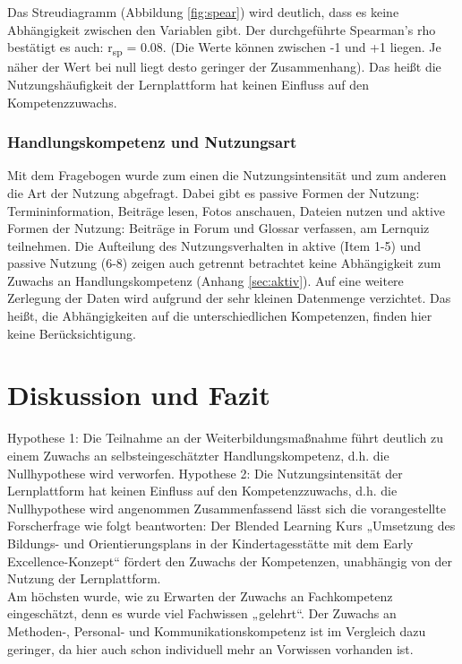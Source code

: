 \documentclass[12pt,smallheadings, bibliography=totoc]{scrartcl}
\begin{document}
Das Streudiagramm (Abbildung \ref{fig:spear}) wird deutlich, dass es
keine Abhängigkeit zwischen den Variablen gibt. Der durchgeführte
Spearman's rho bestätigt es auch: r\textsubscript{sp} = 0.08. (Die Werte
können zwischen -1 und +1 liegen. Je näher der Wert bei null liegt desto
geringer der Zusammenhang). Das heißt die Nutzungshäufigkeit der
Lernplattform hat keinen Einfluss auf den Kompetenzzuwachs.

\subsubsection{Handlungskompetenz und
Nutzungsart}\label{handlungskompetenz-und-nutzungsart}

Mit dem Fragebogen wurde zum einen die Nutzungsintensität und zum
anderen die Art der Nutzung abgefragt. Dabei gibt es passive Formen der
Nutzung: Termininformation, Beiträge lesen, Fotos anschauen, Dateien
nutzen und aktive Formen der Nutzung: Beiträge in Forum und Glossar
verfassen, am Lernquiz teilnehmen. Die Aufteilung des Nutzungsverhalten
in aktive (Item 1-5) und passive Nutzung (6-8) zeigen auch getrennt
betrachtet keine Abhängigkeit zum Zuwachs an Handlungskompetenz (Anhang
\ref{sec:aktiv}). Auf eine weitere Zerlegung der Daten wird aufgrund der
sehr kleinen Datenmenge verzichtet. Das heißt, die Abhängigkeiten auf
die unterschiedlichen Kompetenzen, finden hier keine Berücksichtigung.

\section{Diskussion und Fazit}\label{diskussion-und-fazit}

Hypothese 1: Die Teilnahme an der Weiterbildungsmaßnahme führt deutlich
zu einem Zuwachs an selbsteingeschätzter Handlungskompetenz, d.h. die
Nullhypothese wird verworfen. Hypothese 2: Die Nutzungsintensität der
Lernplattform hat keinen Einfluss auf den Kompetenzzuwachs, d.h. die
Nullhypothese wird angenommen Zusammenfassend lässt sich die
vorangestellte Forscherfrage wie folgt beantworten: Der Blended Learning
Kurs „Umsetzung des Bildungs- und Orientierungsplans in der
Kindertagesstätte mit dem Early Excellence-Konzept`` fördert den Zuwachs
der Kompetenzen, unabhängig von der Nutzung der Lernplattform.\\
Am höchsten wurde, wie zu Erwarten der Zuwachs an Fachkompetenz
eingeschätzt, denn es wurde viel Fachwissen „gelehrt``. Der Zuwachs an
Methoden-, Personal- und Kommunikationskompetenz ist im Vergleich dazu
geringer, da hier auch schon individuell mehr an Vorwissen vorhanden
ist.
\end{document}
